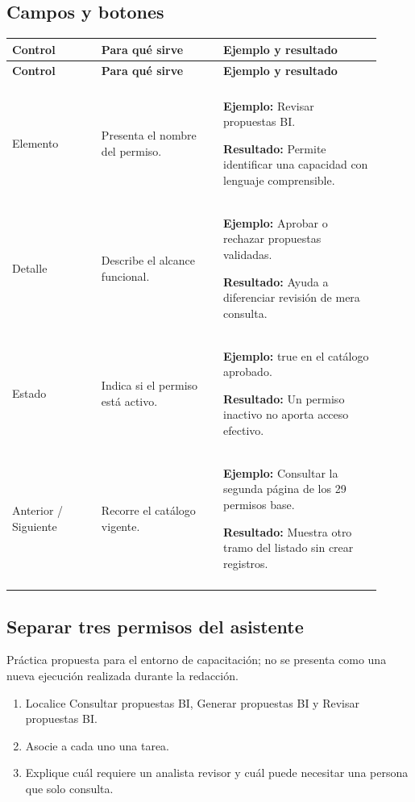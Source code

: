 \subsection{Campos y botones}
\begingroup
\fontsize{10}{12.5}\selectfont
\setlength{\tabcolsep}{5pt}
\renewcommand{\arraystretch}{1.15}
\begin{longtable}{@{}>{\RaggedRight\arraybackslash}p{0.22\linewidth}>{\RaggedRight\arraybackslash}p{0.3\linewidth}>{\RaggedRight\arraybackslash}p{0.39\linewidth}@{}}
\toprule
\textbf{Control} & \textbf{Para qué sirve} & \textbf{Ejemplo y resultado} \\
\midrule
\endfirsthead
\toprule
\textbf{Control} & \textbf{Para qué sirve} & \textbf{Ejemplo y resultado} \\
\midrule
\endhead
\midrule
\multicolumn{3}{r}{\footnotesize Continúa en la página siguiente}\\
\endfoot
\bottomrule
\endlastfoot
Elemento & Presenta el nombre del permiso. & \textbf{Ejemplo:} Revisar propuestas BI.\par\smallskip\textbf{Resultado:} Permite identificar una capacidad con lenguaje comprensible. \\
\addlinespace[3pt]
Detalle & Describe el alcance funcional. & \textbf{Ejemplo:} Aprobar o rechazar propuestas validadas.\par\smallskip\textbf{Resultado:} Ayuda a diferenciar revisión de mera consulta. \\
\addlinespace[3pt]
Estado & Indica si el permiso está activo. & \textbf{Ejemplo:} true en el catálogo aprobado.\par\smallskip\textbf{Resultado:} Un permiso inactivo no aporta acceso efectivo. \\
\addlinespace[3pt]
Anterior / Siguiente & Recorre el catálogo vigente. & \textbf{Ejemplo:} Consultar la segunda página de los 29 permisos base.\par\smallskip\textbf{Resultado:} Muestra otro tramo del listado sin crear registros. \\
\addlinespace[3pt]
\end{longtable}
\endgroup

\subsection{Separar tres permisos del asistente}
Práctica propuesta para el entorno de capacitación; no se presenta como una nueva ejecución realizada durante la redacción.

\begin{enumerate}
\item Localice Consultar propuestas BI, Generar propuestas BI y Revisar propuestas BI.
\item Asocie a cada uno una tarea.
\item Explique cuál requiere un analista revisor y cuál puede necesitar una persona que solo consulta.
\end{enumerate}

